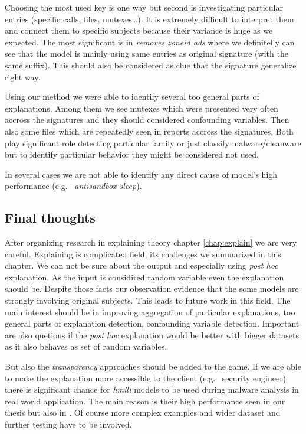 Choosing the most used key is one way but second is investigating particular entries (specific calls, files, mutexes\dots). It is extremely difficult to interpret them and connect them to specific subjects because their variance is huge as we expected. The most significant is in \emph{removes zoneid ads} where we definitelly can see that the model is mainly using same entries as original signature (with the same suffix). This should also be considered as clue that the signature generalize right way.

Using our method we were able to identify several too general parts of explanations. Among them we see mutexes which were presented very often accross the signatures and they should considered confounding variables. Then also some files which are repeatedly seen in reports accross the signatures. Both play significant role detecting particular family or just classify malware/cleanware but to identify particular behavior they might be considered not used.

In several cases we are not able to identify any direct cause of model's high performance (e.g. \ \emph{antisandbox sleep}).

\subsection{Final thoughts}
After organizing research in explaining theory chapter \ref{chap:explain} we are very careful. Explaining is complicated field, its challenges we summarized in this chapter. We can not be sure about the output and especially using \emph{post hoc} explanation. As the input is considired random variable even the explanation should be. Despite those facts our observation evidence that the some models are strongly involving original subjects. This leads to future work in this field. The main interest should be in improving aggregation of particular explanations, too general parts of explanation detection, confounding variable detection. Important are also quetions if the \emph{post hoc} explanation would be better with bigger datasets as it also behaves as set of random variables.

But also the \emph{transparency} approaches should be added to the game. If we are able to make the explanation more accessible to the client (e.g. \ security engineer) there is significant chance for \emph{hmill} models to be used during malware analysis in real world application. The main reason is their high performance seen in our thesis but also in \cite{Mandlik2020} . Of course more complex examples and wider dataset and further testing have to be involved.

